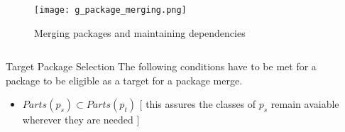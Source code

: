\documentclass[final]{beamer}
\newlength{\sepwid}
\newlength{\onecolwid}
\newlength{\twocolwid}
\begin{document}
\begin{frame}[t]
\begin{columns}[t]


    \begin{column}{\sepwid}\end{column}			%

    \begin{column}{\twocolwid}  %


      \begin{figure}   %
        \begin{center}
          \texttt{[image: g\_package\_merging.png]} \\
          \caption{Merging packages and maintaining dependencies}
          \label{fig:corrSubsys}
        \end{center}
      \end{figure}


    \begin{columns}[t,totalwidth=\twocolwid]
    \begin{column}{\onecolwid}

      \begin{block}{Target Package Selection}
        The following conditions have to be met for a package to be eligible as a
        target for a package merge. 
        \begin{itemize}
          \item $Parts(p_s) \subset Parts(p_t)$ [ this assures the classes of
            $p_s$ remain avaiable wherever they are needed ]
        \end{itemize}
      \end{block}


\end{column}
\end{columns}
\end{column}
\end{columns}
\end{frame}
\end{document}
